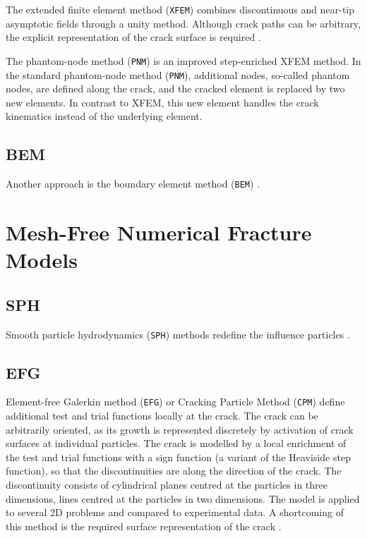 \documentclass[format=acmtog, 12pt, screen=true, review=false]{acmart}
\begin{document}
The extended finite element method (\texttt{XFEM}) \cite{Alt17, Xu10, Xu16} combines discontinuous and near-tip asymptotic fields through a unity method. \cite{Mun13} Although crack paths can be arbitrary, the explicit representation of the crack surface is required \cite{Rab04}. 

\bigbreak
The phantom-node method (\texttt{PNM}) \cite{VuB13} is an improved step-enriched XFEM method. In the standard phantom-node method (\texttt{PNM}), additional nodes, so-called phantom nodes, are defined along the crack, and the cracked element is replaced by two new elements. In contrast to XFEM, this new element handles the crack kinematics instead of the underlying element.

\subsection{BEM}

Another approach is the boundary element method (\texttt{BEM}) \cite{Mun13}.
\section{Mesh-Free Numerical Fracture Models}

\subsection{SPH}

Smooth particle hydrodynamics (\texttt{SPH}) \cite{Moh17, Moh18} methods redefine the influence particles \cite{Mun13}.

\subsection{EFG}

Element-free Galerkin method (\texttt{EFG}) or Cracking Particle Method (\texttt{CPM})  \cite{Pel16, Fle96, Rab04, Rab07, Rab10}
define additional test and trial functions locally at the crack. The crack can be arbitrarily oriented, as its growth is represented discretely by activation of crack surfaces at individual particles. The crack is modelled by a local enrichment of the test and trial functions with a sign function (a variant of the Heaviside step function), so that the discontinuities are along the direction of the crack. The discontinuity consists of cylindrical planes centred at the particles in three dimensions, lines centred at the particles in two dimensions. The model is applied to several 2D problems and compared to experimental data. A shortcoming of this method is the required surface representation of the crack \cite{Rab04}.
\end{document}
